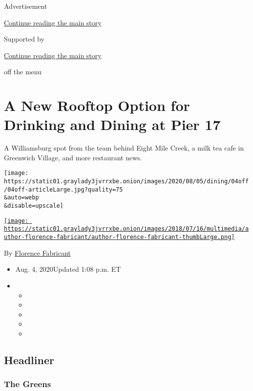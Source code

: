 Advertisement

\protect\hyperlink{after-top}{Continue reading the main story}

Supported by

\protect\hyperlink{after-sponsor}{Continue reading the main story}

off the menu

\hypertarget{a-new-rooftop-option-for-drinking-and-dining-at-pier-17}{%
\section{A New Rooftop Option for Drinking and Dining at Pier
17}\label{a-new-rooftop-option-for-drinking-and-dining-at-pier-17}}

A Williamsburg spot from the team behind Eight Mile Creek, a milk tea
cafe in Greenwich Village, and more restaurant news.

\texttt{[image: https://static01.graylady3jvrrxbe.onion/images/2020/08/05/dining/04off/04off-articleLarge.jpg?quality=75\\\&auto=webp\\\&disable=upscale]}

\href{https://www.nytimes3xbfgragh.onion/by/florence-fabricant}{\texttt{[image: https://static01.graylady3jvrrxbe.onion/images/2018/07/16/multimedia/author-florence-fabricant/author-florence-fabricant-thumbLarge.png]}}

By
\href{https://www.nytimes3xbfgragh.onion/by/florence-fabricant}{Florence
Fabricant}

\begin{itemize}
\item
  Aug. 4, 2020Updated 1:08 p.m. ET
\item
  \begin{itemize}
  \item
  \item
  \item
  \item
  \item
  \end{itemize}
\end{itemize}

\hypertarget{headliner}{%
\subsection{Headliner}\label{headliner}}

\hypertarget{the-greens}{%
\subsubsection{The Greens}\label{the-greens}}

